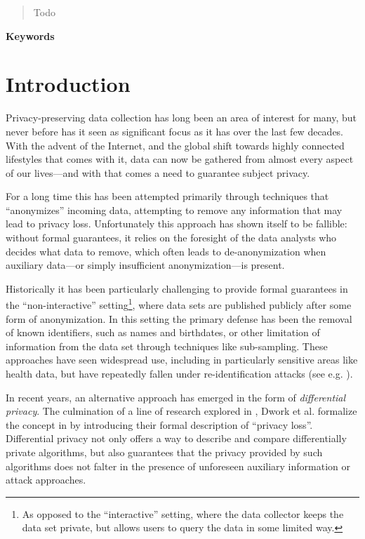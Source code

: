\documentclass[12pt]{article}
\newcommand{\todo}[1]{{\color{red}#1}}
\begin{document}


\renewcommand{\abstractname}{Abstract}
\begin{abstract}
\todo{Todo}
\end{abstract}

\begin{center} \bf Keywords \end{center}

\thispagestyle{empty}
\tableofcontents
\newpage

\section{Introduction}

Privacy-preserving data collection has long been an area of interest for many, but never before has it seen as significant focus as it has over the last few decades. With the advent of the Internet, and the global shift towards highly connected lifestyles that comes with it, data can now be gathered from almost every aspect of our lives---and with that comes a need to guarantee subject privacy.

For a long time this has been attempted primarily through techniques that ``anonymizes'' incoming data, attempting to remove any information that may lead to privacy loss. Unfortunately this approach has shown itself to be fallible: without formal guarantees, it relies on the foresight of the data analysts who decides what data to remove, which often leads to de-anonymization when auxiliary data---or simply insufficient anonymization---is present.

\bigskip

Historically it has been particularly challenging to provide formal guarantees in the ``non-interactive'' setting\footnote{As opposed to the ``interactive'' setting, where the data collector keeps the data set private, but allows users to query the data in some limited way.}, where data sets are published publicly after some form of anonymization. In this setting the primary defense has been the removal of known identifiers, such as names and birthdates, or other limitation of information from the data set through techniques like sub-sampling. These approaches have seen widespread use, including in particularly sensitive areas like health data, but have repeatedly fallen under re-identification attacks (see e.g. \cite{reidentification2011}).

In recent years, an alternative approach has emerged in the form of \emph{differential privacy}. The culmination of a line of research explored in \cite{precursor_2003,precursor_2004,precusor_2005}, Dwork et al. formalize the concept in \cite{dworketal2006} by introducing their formal description of ``privacy loss''. Differential privacy not only offers a way to describe and compare differentially private algorithms, but also guarantees that the privacy provided by such algorithms does not falter in the presence of unforeseen auxiliary information or attack approaches.
\end{document}
